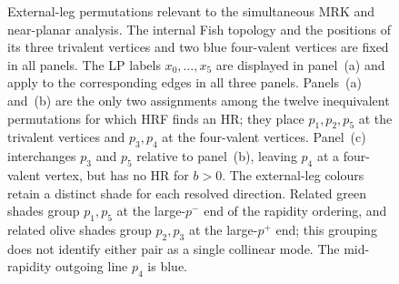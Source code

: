 \documentclass[a4paper,11pt]{article}
\begin{document}
\begin{figure}[!b]
\caption{External-leg permutations relevant to the simultaneous MRK and
near-planar analysis.  The internal Fish topology and the positions of its
three trivalent vertices and two blue four-valent vertices are fixed in all
panels.  The LP labels \(x_0,\ldots,x_5\) are displayed in panel~(a) and
apply to the corresponding edges in all three panels.  Panels~(a) and~(b)
are the only two assignments among the twelve inequivalent permutations for
which HRF finds an HR; they place \(p_1,p_2,p_5\) at the
trivalent vertices and \(p_3,p_4\) at the four-valent vertices.  Panel~(c)
interchanges \(p_3\) and \(p_5\) relative to panel~(b), leaving \(p_4\) at a
four-valent vertex, but has no HR for \(b>0\).  The external-leg colours
retain a distinct shade for each resolved direction.  Related green shades
group \(p_1,p_5\) at the large-\(p^-\) end of the rapidity ordering, and
related olive shades group \(p_2,p_3\) at the large-\(p^+\) end; this grouping
does not identify either pair as a single collinear mode.  The mid-rapidity
outgoing line \(p_4\) is blue.}
\label{fig:five-mrk-planar-attachments}
\end{figure}
\end{document}
